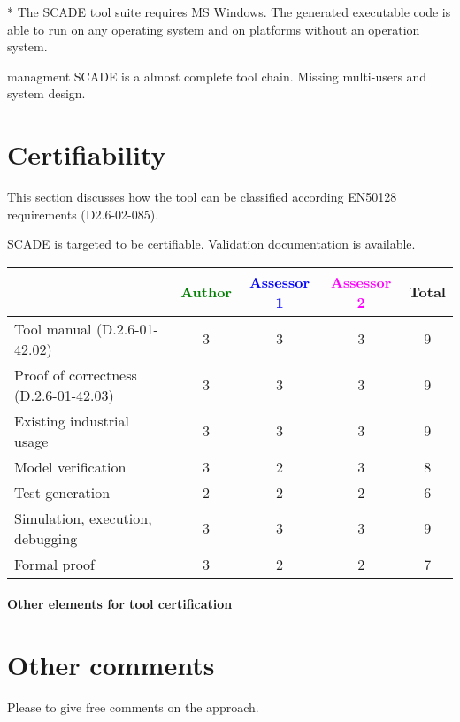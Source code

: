 \begin{author_comment}
* The SCADE tool suite requires MS Windows. The generated executable code is able to run on any operating system and on platforms without an operation system.   
\end{author_comment}

\begin{assessor2}managment
SCADE is a almost complete tool chain. Missing multi-users and system design.
\end{assessor2}
\section{Certifiability}

This section discusses how the tool can be classified according EN50128 requirements (D2.6-02-085).

\begin{author_comment}
SCADE is targeted to be certifiable. Validation documentation is available.   
\end{author_comment}


\begin{tabular}{|l | c | c | c | c|}
\hline
& \textcolor{green}{Author} & \textcolor{blue}{Assessor 1} & \textcolor{magenta}{Assessor 2} & Total \\
\hline 
Tool manual (D.2.6-01-42.02) & 3 & 3 &3 & 9 \\
\hline
Proof of correctness (D.2.6-01-42.03)   & 3 & 3 &3 & 9 \\
\hline
Existing industrial  usage  & 3 & 3 &3 & 9 \\
\hline
Model verification & 3 & 2 &3 & 8 \\
\hline
Test generation & 2 & 2 &2 & 6 \\
\hline
Simulation, execution, debugging & 3 & 3 &3 & 9 \\
\hline
Formal proof & 3 & 2 &2 & 7 \\
\hline
\end{tabular}

\paragraph{Other elements for tool certification}

\section{Other comments}
Please to  give free comments on the approach.




